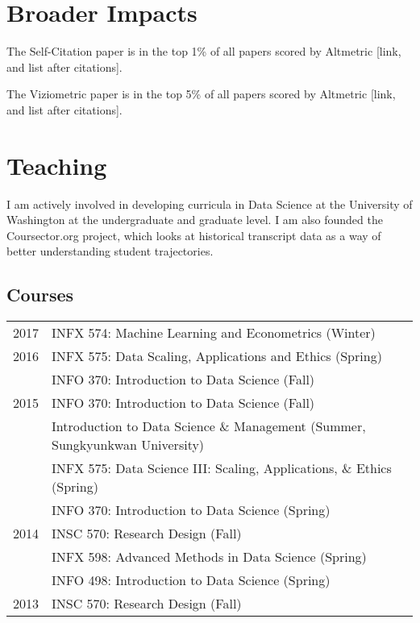 \documentclass[11pt]{article}
\begin{document}
\section*{\textbf{Broader Impacts}}

The Self-Citation paper is in the top 1\% of all papers scored by Altmetric [link, and list after citations].

The Viziometric paper is in the top 5\% of all papers scored by Altmetric [link, and list after citations].


\section*{\textbf{Teaching}}

I am actively involved in developing curricula in Data Science at the University of Washington at the undergraduate and graduate level.  I am also founded the Coursector.org project, which looks at historical transcript data as a way of better understanding student trajectories.


\subsection*{Courses}
\setlength{\extrarowheight}{10pt}
\begin{longtable}{p{0.5in}|p{5.5in}}
  2017  & INFX 574: Machine Learning and Econometrics (Winter) \\
  2016 	& INFX 575: Data Scaling, Applications and Ethics (Spring) \\
  		  & INFO 370: Introduction to Data Science (Fall) \\
  2015 	& INFO 370: Introduction to Data Science (Fall) \\
  		& Introduction to Data Science \& Management (Summer, Sungkyunkwan University) \\
  		& INFX 575: Data Science III: Scaling, Applications, \& Ethics (Spring) \\
  		& INFO 370: Introduction to Data Science (Spring) \\
  2014	& INSC 570: Research Design (Fall) \\
  		& INFX 598: Advanced Methods in Data Science (Spring) \\
  		& INFO 498: Introduction to Data Science (Spring) \\
  2013  & INSC 570: Research Design (Fall) \\		
\end{longtable}
\end{document}
